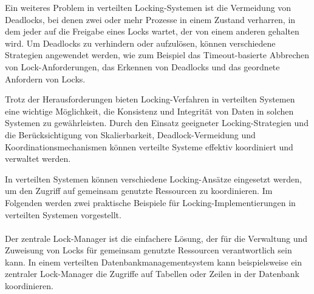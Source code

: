 \documentclass[../vs-script-first-v01.tex]{subfiles}
\begin{document}
Ein weiteres Problem in verteilten Locking-Systemen ist die Vermeidung von Deadlocks, bei denen zwei oder mehr Prozesse in einem Zustand verharren, in dem jeder auf die Freigabe eines Locks wartet, der von einem anderen gehalten wird. Um Deadlocks zu verhindern oder aufzulösen, können verschiedene Strategien angewendet werden, wie zum Beispiel das Timeout-basierte Abbrechen von Lock-Anforderungen, das Erkennen von Deadlocks und das geordnete Anfordern von Locks.

Trotz der Herausforderungen bieten Locking-Verfahren in verteilten Systemen eine wichtige Möglichkeit, die Konsistenz und Integrität von Daten in solchen Systemen zu gewährleisten. Durch den Einsatz geeigneter Locking-Strategien und die Berücksichtigung von Skalierbarkeit, Deadlock-Vermeidung und Koordinationsmechanismen können verteilte Systeme effektiv koordiniert und verwaltet werden.

In verteilten Systemen können verschiedene Locking-Ansätze eingesetzt werden, um den Zugriff auf gemeinsam genutzte Ressourcen zu koordinieren. Im Folgenden werden zwei praktische Beispiele für Locking-Implementierungen in verteilten Systemen vorgestellt.
\\\\
Der zentrale Lock-Manager ist die einfachere Lösung, der für die Verwaltung und Zuweisung von Locks für gemeinsam genutzte Ressourcen verantwortlich sein kann. In einem verteilten Datenbankmanagementsystem kann beispielsweise ein zentraler Lock-Manager die Zugriffe auf Tabellen oder Zeilen in der Datenbank koordinieren.
\end{document}
